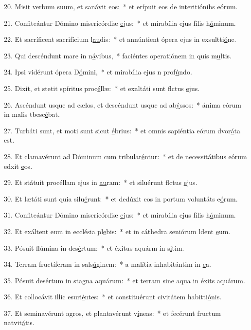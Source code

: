20. Misit verbum suum, et sanávit \uline{e}os:~* et erípuit eos de interitiónibs e\uline{ó}rum.\par 
21. Confiteántur Dómino misericórdiæ \uline{e}jus:~* et mirabília ejus fílis h\uline{ó}minum.\par 
22. Et sacríficent sacrifícium l\uline{au}dis:~* et annúntient ópera ejus in exsultti\uline{ó}ne.\par 
23. Qui descéndunt mare in n\uline{á}vibus,~* faciéntes operatiónem in quis m\uline{u}ltis.\par 
24. Ipsi vidérunt ópera D\uline{ó}mini,~* et mirabília ejus n prof\uline{ú}ndo.\par 
25. Dixit, et stetit spíritus proc\uline{é}llæ:~* et exaltáti sunt flctus \uline{e}jus.\par 
26. Ascéndunt usque ad cælos, et descéndunt usque ad ab\uline{ý}ssos:~* ánima eórum in malis tbesc\uline{é}bat.\par 
27. Turbáti sunt, et moti sunt sicut \uline{é}brius:~* et omnis sapiéntia eórum dvor\uline{á}ta est.\par 
28. Et clamavérunt ad Dóminum cum tribular\uline{é}ntur:~* et de necessitátibus eórum edxit \uline{e}os.\par 
29. Et státuit procéllam ejus in \uline{au}ram:~* et siluérunt flctus \uline{e}jus.\par 
30. Et lætáti sunt quia silu\uline{é}runt:~* et dedúxit eos in portum voluntáts e\uline{ó}rum.\par 
31. Confiteántur Dómino misericórdiæ \uline{e}jus:~* et mirabília ejus fílis h\uline{ó}minum.\par 
32. Et exáltent eum in ecclésia pl\uline{e}bis:~* et in cáthedra seniórum ldent \uline{e}um.\par 
33. Pósuit flúmina in des\uline{é}rtum:~* et éxitus aquárm in s\uline{i}tim.\par 
34. Terram fructíferam in sals\uline{ú}ginem:~* a malítia inhabitántim in \uline{e}a.\par 
35. Pósuit desértum in stagna a\uline{quá}rum:~* et terram sine aqua in éxits a\uline{quá}rum.\par 
36. Et collocávit illic esuri\uline{é}ntes:~* et constituérunt civitátem habitti\uline{ó}nis.\par 
37. Et seminavérunt agros, et plantavérunt v\uline{í}neas:~* et fecérunt fructum natvit\uline{á}tis.\par 

